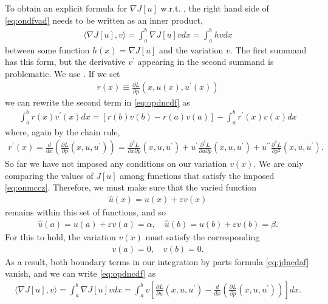 \documentclass{article}
\begin{document}
To obtain an explicit formula for $\nabla J[u]$ w.r.t. , the right hand side of \cref{eq:ondfvad} needs to be written as an inner product,
\begin{align*}
\langle\nabla J[u], v\rangle=\int_{a}^{b} \nabla J[u] v d x=\int_{a}^{b} h v d x
\end{align*}
between some function $h(x)=\nabla J[u]$ and the variation $v$. The first summand has this form, but the derivative $v^{\prime}$ appearing in the second summand is problematic. We use . If we set
\begin{align*}
r(x) \equiv \frac{\partial L}{\partial p}\left(x, u(x), u^{\prime}(x)\right)
\end{align*}
we can rewrite the second  term in \cref{eq:opdncdf} as
\begin{align}
\int_{a}^{b} r(x) v^{\prime}(x) d x=[r(b) v(b)-r(a) v(a)]-\int_{a}^{b} r^{\prime}(x) v(x) d x\label{eq:jdncdaf}
\end{align}
where, again by the chain rule,
\begin{align*}
r^{\prime}(x)=\frac{d}{d x}\left(\frac{\partial L}{\partial p}\left(x, u, u^{\prime}\right)\right)=\frac{\partial^{2} L}{\partial x \partial p}\left(x, u, u^{\prime}\right)+u^{\prime} \frac{\partial^{2} L}{\partial u \partial p}\left(x, u, u^{\prime}\right)+u^{\prime \prime} \frac{\partial^{2} L}{\partial p^{2}}\left(x, u, u^{\prime}\right) .
\end{align*}
So far we have not imposed any conditions on our variation $v(x)$. We are only comparing the values of $J[u]$ among functions that satisfy the imposed  \cref{eq:onmccz}. Therefore, we must make sure that the varied function
\begin{align*}
\widehat{u}(x)=u(x)+\varepsilon v(x)
\end{align*}
remains within this set of functions, and so
\begin{align*}
\widehat{u}(a)=u(a)+\varepsilon v(a)=\alpha, \quad \widehat{u}(b)=u(b)+\varepsilon v(b)=\beta .
\end{align*}
For this to hold, the variation $v(x)$ must satisfy the corresponding 
\begin{align*}
v(a)=0, \quad v(b)=0 .
\end{align*}
As a result, both boundary terms in our integration by parts formula \cref{eq:jdncdaf} vanish, and we can write \cref{eq:opdncdf} as
\begin{align}
\langle\nabla J[u], v\rangle=\int_{a}^{b} \nabla J[u] v d x=\int_{a}^{b} v\left[\frac{\partial L}{\partial u}\left(x, u, u^{\prime}\right)-\frac{d}{d x}\left(\frac{\partial L}{\partial p}\left(x, u, u^{\prime}\right)\right)\right] d x.
\end{align}
\end{document}
